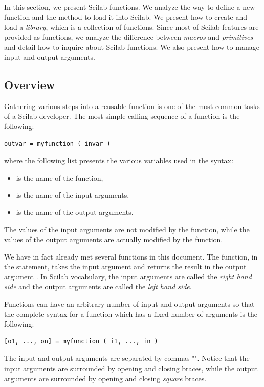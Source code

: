 In this section, we present Scilab functions.
We analyze the way to define a new function and the method
to load it into Scilab.
We present how to create and load a \emph{library}, which is a collection
of functions.
Since most of Scilab features are provided as functions,
we analyze the difference between \emph{macros} and \emph{primitives}
and detail how to inquire about Scilab functions.
We also present how to manage input and output arguments.

\subsection{Overview}

Gathering various steps into a reusable function is one of the 
most common tasks of a Scilab developer. 
The most simple calling sequence of a function is the following:
\lstset{language=scilabscript}
\begin{lstlisting}
outvar = myfunction ( invar )
\end{lstlisting}
where the following list presents the various variables used in the syntax:
\begin{itemize}
\item {} is the name of the function,
\item {} is the name of the input arguments,
\item {} is the name of the output arguments.
\end{itemize}
The values of the input arguments are not modified by the function, while the 
values of the output arguments are actually modified by the function.

We have in fact already met several functions in this document.
The  function, in the  statement, 
takes the input argument  and returns the result in the output argument .
In Scilab vocabulary, the input arguments are called the \emph{right hand side}
and the output arguments are called the \emph{left hand side}.

Functions can have an arbitrary number of input and 
output arguments so that the complete syntax for a function which has a 
fixed number of arguments is the following:
\lstset{language=scilabscript}
\begin{lstlisting}
[o1, ..., on] = myfunction ( i1, ..., in )
\end{lstlisting}
The input and output arguments are separated by commas "\scivar{,}".
Notice that the input arguments are surrounded by opening and closing braces,
while the output arguments are surrounded by opening and closing \emph{square} braces.

